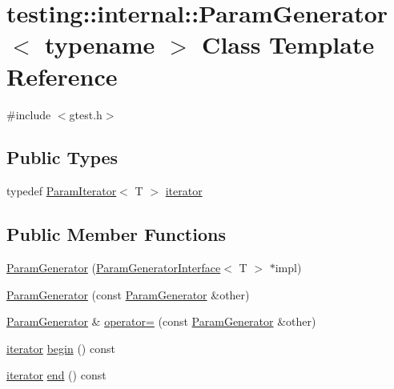 \hypertarget{classtesting_1_1internal_1_1_param_generator}{\section{testing\-:\-:internal\-:\-:Param\-Generator$<$ typename $>$ Class Template Reference}
\label{classtesting_1_1internal_1_1_param_generator}
}


{\ttfamily \#include $<$gtest.\-h$>$}

\subsection*{Public Types}
\begin{DoxyCompactItemize}
\item 
typedef \hyperlink{classtesting_1_1internal_1_1_param_iterator}{Param\-Iterator}$<$ T $>$ \hyperlink{classtesting_1_1internal_1_1_param_generator_ae54d0fb888817da53218c680919262fb}{iterator}
\end{DoxyCompactItemize}
\subsection*{Public Member Functions}
\begin{DoxyCompactItemize}
\item 
\hyperlink{classtesting_1_1internal_1_1_param_generator_a53baf7eea2ea7078739f3a9f36c1361f}{Param\-Generator} (\hyperlink{classtesting_1_1internal_1_1_param_generator_interface}{Param\-Generator\-Interface}$<$ T $>$ $\ast$impl)
\item 
\hyperlink{classtesting_1_1internal_1_1_param_generator_a5354b8979a0628996b144fcf864672d4}{Param\-Generator} (const \hyperlink{classtesting_1_1internal_1_1_param_generator}{Param\-Generator} \&other)
\item 
\hyperlink{classtesting_1_1internal_1_1_param_generator}{Param\-Generator} \& \hyperlink{classtesting_1_1internal_1_1_param_generator_a98cb121143b7ea2d9d7a750ccacb9e36}{operator=} (const \hyperlink{classtesting_1_1internal_1_1_param_generator}{Param\-Generator} \&other)
\item 
\hyperlink{classtesting_1_1internal_1_1_param_generator_ae54d0fb888817da53218c680919262fb}{iterator} \hyperlink{classtesting_1_1internal_1_1_param_generator_a6e54952b34a229d47ade26aa71f15b2f}{begin} () const 
\item 
\hyperlink{classtesting_1_1internal_1_1_param_generator_ae54d0fb888817da53218c680919262fb}{iterator} \hyperlink{classtesting_1_1internal_1_1_param_generator_a06dae4191027f4e5f9f1ca4d9a5caa2f}{end} () const 
\end{DoxyCompactItemize}


